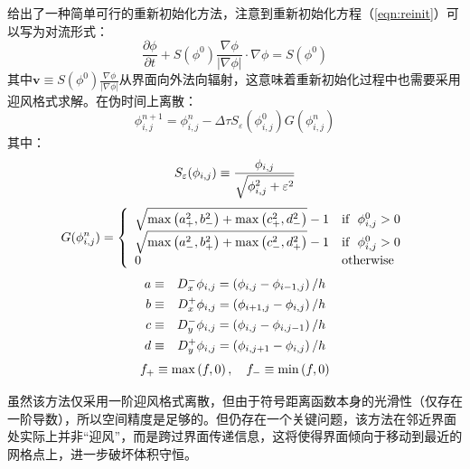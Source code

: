 \documentclass[11pt]{article}
\begin{document}
\citet{sussman_level_1994}给出了一种简单可行的重新初始化方法，注意到重新初始化方程（\autoref{eqn:reinit}）可以写为对流形式：
\begin{equation}
    \frac{\partial \phi}{\partial t}+S(\phi^0)\frac{\nabla\phi}{|\nabla\phi|}\cdot\nabla\phi=S(\phi^0)
\end{equation}
其中$\bm{v}\equiv S(\phi^0)\frac{\nabla\phi}{|\nabla\phi|}$从界面向外法向辐射，这意味着重新初始化过程中也需要采用迎风格式求解。在伪时间上离散：
\begin{equation}
    \phi^{n+1}_{i,j}=\phi^n_{i,j}-\Delta\tau S_\varepsilon\left(\phi^0_{i,j}\right)G\left(\phi^n_{i,j}\right)
\end{equation}
其中：
\begin{equation}
    S_\varepsilon(\phi_{i,j})\equiv\frac{\phi_{i,j}}{\sqrt{\phi^2_{i,j}+\varepsilon^2}}\notag
\end{equation}
\begin{equation}
    G(\phi^n_{i,j})=\left\{\begin{array}{ll}
        \sqrt{\max\left(a_+^2,b_-^2\right)+\max\left(c_+^2,d_-^2\right)}-1 & \text{if\ \ } \phi^0_{i,j}>0 \\
        \sqrt{\max\left(a_-^2,b_+^2\right)+\max\left(c_-^2,d_+^2\right)}-1 & \text{if\ \ } \phi^0_{i,j}>0 \\
        0                                                                  & \text{otherwise}             \\
    \end{array}\right. \notag
\end{equation}
\begin{eqnarray}
    a &\equiv& D^-_x\phi_{i,j}=\left(\phi_{i,j}-\phi_{i-1,j}\right)/h \notag\\
    b &\equiv& D^+_x\phi_{i,j}=\left(\phi_{i+1,j}-\phi_{i,j}\right)/h \notag\\
    c &\equiv& D^-_y\phi_{i,j}=\left(\phi_{i,j}-\phi_{i,j-1}\right)/h \notag\\
    d &\equiv& D^+_y\phi_{i,j}=\left(\phi_{i,j+1}-\phi_{i,j}\right)/h \notag
\end{eqnarray}
\begin{equation}
    f_+\equiv\max\left(f,0\right),\quad f_-\equiv\min\left(f,0\right) \notag
\end{equation}

虽然该方法仅采用一阶迎风格式离散，但由于符号距离函数本身的光滑性（仅存在一阶导数），所以空间精度是足够的。但仍存在一个关键问题，该方法在邻近界面处实际上并非“迎风”，而是跨过界面传递信息，这将使得界面倾向于移动到最近的网格点上，进一步破坏体积守恒。
\end{document}
